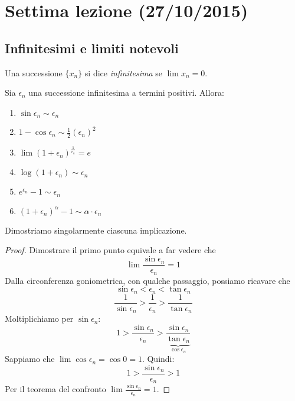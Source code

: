 \chapter{Settima lezione (27/10/2015)}

\section{Infinitesimi e limiti notevoli}

\begin{definition}
Una successione $\{x_n\}$ si dice \emph{infinitesima} se $\lim x_n = 0$.
\end{definition}

\begin{proposition}
Sia $\epsilon_n$ una successione infinitesima a termini positivi. Allora:
\begin{enumerate}
\item $\sin \epsilon_n \sim \epsilon_n$
\item $1 - \cos \epsilon_n \sim \frac{1}{2} (\epsilon_n)^2$
\item $\lim (1+\epsilon_n)^\frac{1}{\epsilon_n} = e$
\item $\log (1 + \epsilon_n) \sim \epsilon_n$
\item $e^{\epsilon_n} - 1 \sim \epsilon_n$
\item $(1+\epsilon_n)^\alpha - 1 \sim \alpha \cdot \epsilon_n$
\end{enumerate}
\end{proposition}

Dimostriamo singolarmente ciascuna implicazione.

\begin{proof}
Dimostrare il primo punto equivale a far vedere che
\begin{equation*}
\lim \frac{\sin \epsilon_n}{\epsilon_n} = 1
\end{equation*}
Dalla circonferenza goniometrica, con qualche passaggio, possiamo ricavare che
\begin{equation*}
\sin \epsilon_n < \epsilon_n < \tan \epsilon_n
\end{equation*}
\begin{equation*}
\frac{1}{\sin \epsilon_n} > \frac{1}{\epsilon_n} > \frac{1}{\tan \epsilon_n}
\end{equation*}
Moltiplichiamo per $\sin \epsilon_n$:
\begin{equation*}
1 > \frac{\sin \epsilon_n}{\epsilon_n} > \underbrace{\frac{\sin \epsilon_n}{\tan \epsilon_n}}_{\cos \epsilon_n}
\end{equation*}
Sappiamo che $\lim \cos \epsilon_n = \cos 0 = 1$. Quindi:
\begin{equation*}
1 > \frac{\sin \epsilon_n}{\epsilon_n} > 1
\end{equation*}
Per il teorema del confronto $\lim \frac{\sin \epsilon_n}{\epsilon_n} = 1$.
\end{proof}

